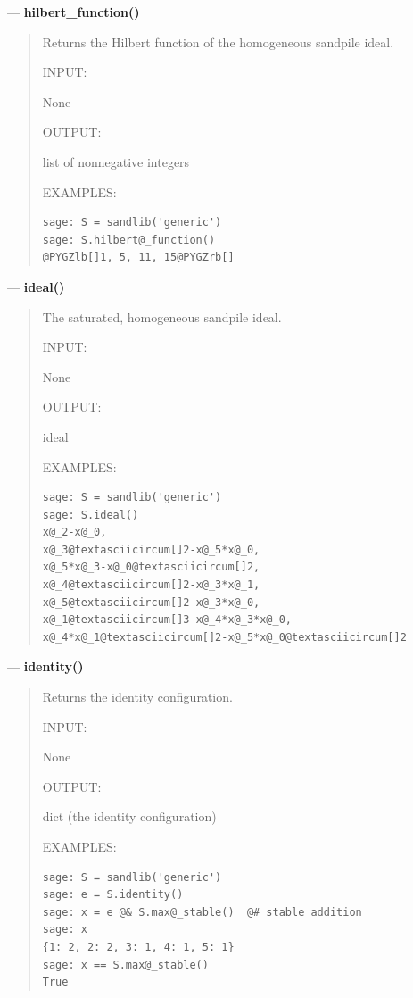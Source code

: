 \documentclass[letterpaper,10pt,english]{manual}
\begin{document}
---
\hypertarget{hilbert-function}{}
\textbf{hilbert\_function()}
\begin{quote}

Returns the Hilbert function of the homogeneous sandpile ideal.

INPUT:

None

OUTPUT:

list of nonnegative integers

EXAMPLES:

\begin{Verbatim}[commandchars=@\[\]]
sage: S = sandlib('generic')
sage: S.hilbert@_function()
@PYGZlb[]1, 5, 11, 15@PYGZrb[]
\end{Verbatim}
\end{quote}

---
\hypertarget{ideal}{}
\textbf{ideal()}
\begin{quote}

The saturated, homogeneous sandpile ideal.

INPUT:

None

OUTPUT:

ideal

EXAMPLES:

\begin{Verbatim}[commandchars=@\[\]]
sage: S = sandlib('generic')
sage: S.ideal()
x@_2-x@_0,
x@_3@textasciicircum[]2-x@_5*x@_0,
x@_5*x@_3-x@_0@textasciicircum[]2,
x@_4@textasciicircum[]2-x@_3*x@_1,
x@_5@textasciicircum[]2-x@_3*x@_0,
x@_1@textasciicircum[]3-x@_4*x@_3*x@_0,
x@_4*x@_1@textasciicircum[]2-x@_5*x@_0@textasciicircum[]2
\end{Verbatim}
\end{quote}

---
\hypertarget{identity}{}
\textbf{identity()}
\begin{quote}

Returns the identity configuration.

INPUT:

None

OUTPUT:

dict (the identity configuration)

EXAMPLES:

\begin{Verbatim}[commandchars=@\[\]]
sage: S = sandlib('generic')
sage: e = S.identity()
sage: x = e @& S.max@_stable()  @# stable addition
sage: x
{1: 2, 2: 2, 3: 1, 4: 1, 5: 1}
sage: x == S.max@_stable()
True
\end{Verbatim}
\end{quote}
\end{document}
